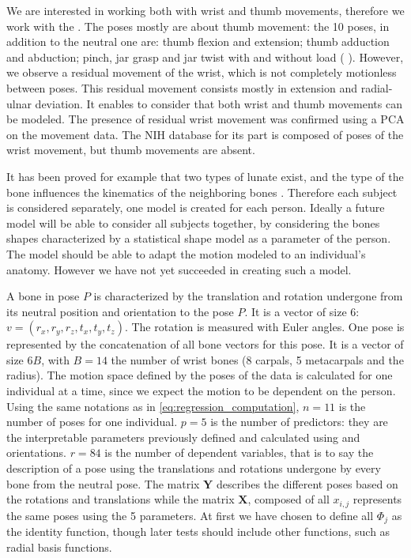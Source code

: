 We are interested in working both with wrist and thumb movements, therefore we work with the \db*. The poses mostly are about thumb movement: the 10 poses, in addition to the neutral one are: thumb flexion and extension; thumb adduction and abduction; pinch, jar grasp and jar twist with and without load ( ). However, we observe a residual movement of the wrist, which is not completely motionless between poses. This residual movement consists mostly in extension and radial-ulnar deviation. It enables to consider that both wrist and thumb movements can be modeled. The presence of residual wrist movement was confirmed using a PCA on the movement data. The NIH database for its part is composed of poses of the wrist movement, but thumb movements are absent. 


It has been proved for example that two types of lunate exist, and the type of the bone influences the kinematics of the neighboring bones \cite{nakamura_2000_motion, galley_2007_influence, bain_2015_effect}. Therefore each subject is considered separately, one model is created for each person. Ideally a future model will be able to consider all subjects together, by considering the bones shapes characterized by a statistical shape model as a parameter of the person. The model should be able to adapt the motion modeled to an individual's anatomy. However we have not yet succeeded in creating such a model.

A bone in pose $P$ is characterized by the translation and rotation undergone from its neutral position and orientation to the pose $P$. It is a vector of size $6$: $v = (r_x, r_y, r_z,\allowbreak t_x, t_y, t_z)$. The rotation is measured with Euler angles. One pose is represented by the concatenation of all bone vectors for this pose. It is a vector of size $6B$, with $B=14$ the number of wrist bones (8 carpals, 5 metacarpals and the radius). The motion space defined by the poses of the data is calculated for one individual at a time, since we expect the motion to be dependent on the person. Using the same notations as in \eqref{eq:regression_computation}, $n=11$ is the number of poses for one individual. $p=5$ is the number of predictors: they are the interpretable parameters previously defined and calculated using \mcu* and \mct* orientations. $r=84$ is the number of dependent variables, that is to say the description of a pose using the translations and rotations undergone by every bone from the neutral pose. The matrix $\mathbf{Y}$ describes the different poses based on the rotations and translations while the matrix $\mathbf{X}$, composed of all $x_{i,j}$ represents the same poses using the 5 parameters. At first we have chosen to define all $\Phi_j$ as the identity function, though later tests should include other functions, such as radial basis functions. 


